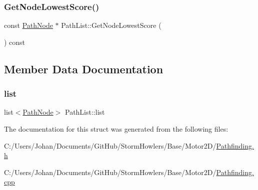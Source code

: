 \mbox{\label{struct_path_list_abd63a84c3d60b40334427f1698b170de}} 
\subsubsection{\texorpdfstring{GetNodeLowestScore()}{GetNodeLowestScore()}}
{\footnotesize\ttfamily const \mbox{\hyperlink{struct_path_node}{Path\+Node}} $\ast$ Path\+List\+::\+Get\+Node\+Lowest\+Score (\begin{DoxyParamCaption}{ }\end{DoxyParamCaption}) const}



\subsection{Member Data Documentation}
\mbox{\label{struct_path_list_a7ec3d845ad003ce8a99d081a2add8f6b}} 
\subsubsection{\texorpdfstring{list}{list}}
{\footnotesize\ttfamily list$<$\mbox{\hyperlink{struct_path_node}{Path\+Node}}$>$ Path\+List\+::list}



The documentation for this struct was generated from the following files\+:\begin{DoxyCompactItemize}
\item 
C\+:/\+Users/\+Johan/\+Documents/\+Git\+Hub/\+Storm\+Howlers/\+Base/\+Motor2\+D/\mbox{\hyperlink{_pathfinding_8h}{Pathfinding.\+h}}\item 
C\+:/\+Users/\+Johan/\+Documents/\+Git\+Hub/\+Storm\+Howlers/\+Base/\+Motor2\+D/\mbox{\hyperlink{_pathfinding_8cpp}{Pathfinding.\+cpp}}\end{DoxyCompactItemize}
